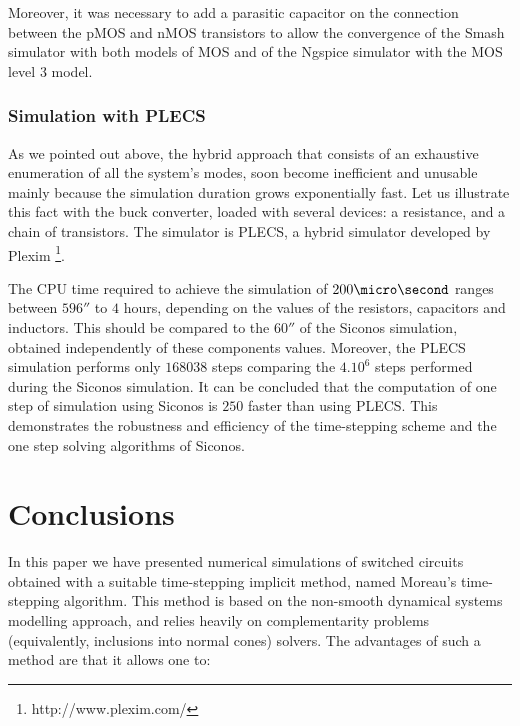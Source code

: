 Moreover, it was necessary to add a parasitic capacitor on the connection between the pMOS and nMOS
transistors to allow the convergence of the {\sc Smash} simulator with both models of MOS
and of the {\sc Ngspice} simulator with the MOS level 3 model.


\subsubsection{Simulation with PLECS}

As we pointed out above, the hybrid approach that consists of an exhaustive enumeration of all the system's modes, soon become inefficient and unusable mainly because the simulation duration grows exponentially fast. Let us illustrate this fact with the buck converter, loaded with several devices: a resistance, and a chain of transistors. The simulator is PLECS, a hybrid simulator developed by Plexim \footnote{http://www.plexim.com/}. 

The CPU time required to achieve the simulation of $200 \micro\second$ ranges between $596 \second$ to $4$ hours,
depending on the values of the resistors, capacitors and inductors. This should be compared to the $60\second$ of the {\sc Siconos} simulation, obtained independently of these components values. Moreover, the
PLECS simulation performs only $168038$ steps comparing the $4.10^{6}$ steps performed during the {\sc Siconos}
simulation. It can be concluded that the computation of one step of simulation using {\sc Siconos} is $250$
faster than using PLECS. This demonstrates the robustness and efficiency of the time-stepping scheme
and the one step solving algorithms of {\sc Siconos}.


\section{Conclusions}
\label{section5}


In this paper we have presented numerical simulations of switched circuits obtained with a suitable time-stepping implicit method, named Moreau's time-stepping algorithm. This method is based on the non-smooth dynamical systems modelling approach, and relies heavily on complementarity problems (equivalently, inclusions into normal cones) solvers. The advantages of such a method are that it allows one to:

